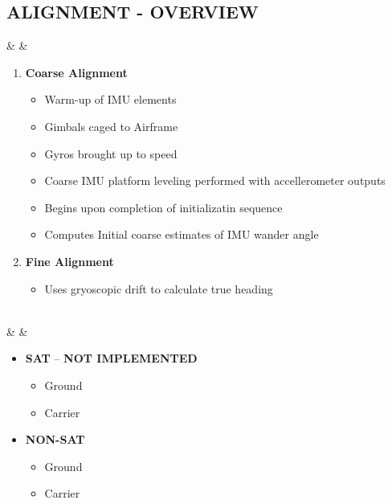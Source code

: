 \documentclass[fontInter]{TechCheck}
\begin{document}
	\clearpage

	\subsection{ALIGNMENT - OVERVIEW}
	\begin{listlongtable}
		\textbf{\textbullet} &  &
		\begin{minipage}[t]{\linewidth}
			\vspace{-7pt}
			\begin{enumerate}
				\item \textbf{Coarse Alignment}
				\begin{itemize}
					\item Warm-up of IMU elements
					\item Gimbals caged to Airframe
					\item Gyros brought up to speed
					\item Coarse IMU platform leveling performed with accellerometer outputs
					\item Begins upon completion of initializatin sequence
					\item Computes Initial coarse estimates of IMU wander angle
				\end{itemize}
				\item \textbf{Fine Alignment}
				\begin{itemize}
					\item Uses gryoscopic drift to calculate true heading
				\end{itemize}
			\end{enumerate}
		\end{minipage} \\
		\midrule
		\textbf{\textbullet} &  &
		\begin{minipage}[t]{\linewidth}
			\vspace{-7pt}
			\begin{itemize}
				\item \textbf{SAT} -- \textbf{NOT IMPLEMENTED}
				\begin{itemize}
					\item Ground
					\item Carrier
				\end{itemize}
				\item \textbf{NON-SAT}
				\begin{itemize}
					\item Ground
					\item Carrier
				\end{itemize}

\end{itemize}
\end{minipage}
\end{listlongtable}
\end{document}

